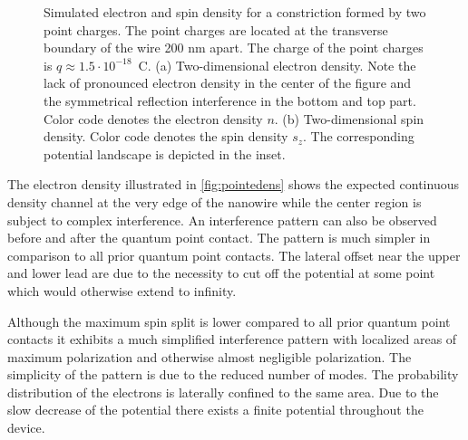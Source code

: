 \begin{figure}[h]
  \hspace{14pt}
  \hspace{4pt}
  \caption{Simulated electron and spin density for a constriction formed by two point charges. The point charges are located at the transverse boundary of the wire 200 nm apart. The charge of the point charges is $q\approx 1.5\cdot 10^{-18}$~C. (a) Two-dimensional electron density. Note the lack of pronounced electron density in the center of the figure and the symmetrical reflection interference in the bottom and top part. Color code denotes the electron density $n$. (b) Two-dimensional spin density. Color code denotes the spin density $s_z$. The corresponding potential landscape is depicted in the inset.}
\end{figure}
The electron density illustrated in \cref{fig:pointedens} shows the expected continuous density channel at the very edge of the nanowire while the center region is subject to complex interference. An interference pattern can also be observed before and after the quantum point contact. The pattern is much simpler in comparison to all prior quantum point contacts. The lateral offset near the upper and lower lead are due to the necessity to cut off the potential at some point which would otherwise extend to infinity.\par
Although the maximum spin split is lower compared to all prior quantum point contacts it exhibits a much simplified interference pattern with localized areas of maximum polarization and otherwise almost negligible polarization. The simplicity of the pattern is due to the reduced number of modes. The probability distribution of the electrons is laterally confined to the same area. Due to the slow decrease of the potential there exists a finite potential throughout the device.\par
